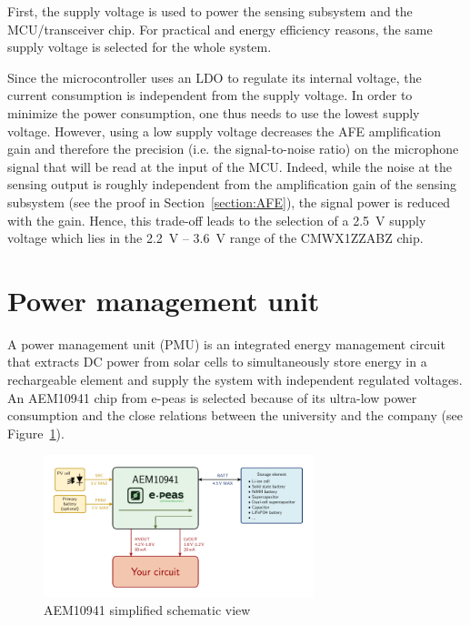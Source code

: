 \documentclass{EPL-master-thesis-covers-EN}
\newcommand{\te}[1]{\textrm{#1}}
\begin{document}
First, the supply voltage is used to power the sensing subsystem and the MCU/transceiver chip. For practical and energy efficiency reasons, the same supply voltage is selected for the whole system.

Since the microcontroller uses an LDO to regulate its internal voltage, the current consumption is independent from the supply voltage. In order to minimize the power consumption, one thus needs to use the lowest supply voltage. However, using a low supply voltage decreases the AFE amplification gain and therefore the precision (i.e. the signal-to-noise ratio) on the microphone signal that will be read at the input of the MCU. Indeed, while the noise at the sensing output is roughly independent from the amplification gain of the sensing subsystem (see the proof in Section~\ref{section:AFE}), the signal power is reduced with the gain. Hence, this trade-off leads to the selection of a \SI{2.5}{V} supply voltage which lies in the \SI{2.2}{V} -- \SI{3.6}{V} range of the CMWX1ZZABZ chip.



\section{Power management unit}
\label{section:PMU}

A power management unit (PMU) is an integrated energy management circuit that extracts DC power from solar cells to simultaneously store energy in a rechargeable element and supply the system with independent regulated voltages. An AEM10941 chip from e-peas is selected because of its ultra-low power consumption and the close relations between the university and the company (see Figure~\ref{fig:AEM10941}).

\begin{figure}[H]
    \centering
    \includegraphics[width=0.7\textwidth]{AEM10941.pdf}
    \caption[AEM10941 simplified schematic view]{AEM10941 simplified schematic view~\cite{AEM10941}}
    \label{fig:AEM10941}
\end{figure}
\end{document}
